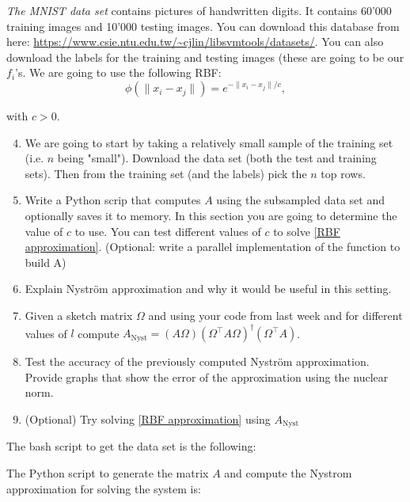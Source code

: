 \documentclass[11pt]{article}
\begin{document}
\textit{The MNIST data set} contains pictures of handwritten digits. It contains 60'000 training images and 10'000 testing images. You can download this database from here: \url{https://www.csie.ntu.edu.tw/~cjlin/libsvmtools/datasets/}. You can also download the labels for the training and testing images (these are going to be our $f_i$'s. We are going to use the following RBF: \\

\[ \phi\left( \|x_i - x_j\| \right) = e^{- \|x_i - x_j\| / c}, \]

with $c > 0$.

\begin{enumerate}
    \setcounter{enumi}{3}
    \item We are going to start by taking a relatively small sample of the training set (i.e. $n$ being "small"). Download the data set (both the test and training sets). Then from the training set (and the labels) pick the $n$ top rows.
    \item Write a Python scrip that computes $A$ using the subsampled data set and optionally saves it to memory. In this section you are going to determine the value of $c$ to use. You can test different values of $c$ to solve  \ref{RBF approximation}. (Optional: write a parallel implementation of the function to build A)
    \item Explain Nyström approximation and why it would be useful in this setting.
    \item Given a sketch matrix $\Omega$ and using your code from last week and for different values of $l$ compute $A_{\text{Nyst}} = (A\Omega)(\Omega^\top A \Omega)^{\dagger} (\Omega^\top A)$. 
    \item Test the accuracy of the previously computed Nyström approximation. Provide graphs that show the error of the approximation using the nuclear norm.
    \item (Optional) Try solving \ref{RBF approximation} using $A_{\text{Nyst}}$
\end{enumerate}

The bash script to get the data set is the following:



The Python script to generate the matrix $A$ and compute the Nystrom approximation for solving the system is:





\end{document}
